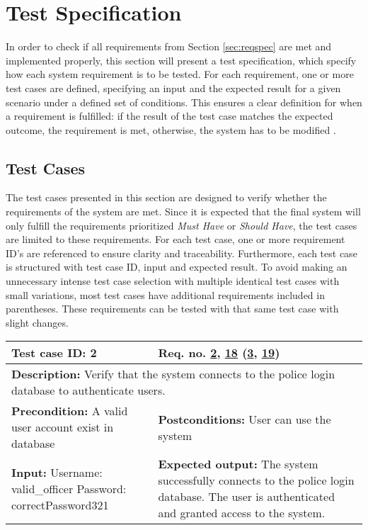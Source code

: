 \section{Test Specification}
\label{sec:testspec}

In order to check if all requirements from Section \ref{sec:reqspec} are met and implemented properly, this section will present a test specification, which specify how each system requirement is to be tested. For each requirement, one or more test cases are defined, specifying an input and the expected result for a given scenario under a defined set of conditions. This ensures a clear definition for when a requirement is fulfilled: if the result of the test case matches the expected outcome, the requirement is met, otherwise, the system has to be modified \cite{testspec_geek}.

\subsection{Test Cases}
The test cases presented in this section are designed to verify whether the requirements of the system are met. Since it is expected that the final system will only fulfill the requirements prioritized \textit{Must Have} or \textit{Should Have}, the test cases are limited to these requirements. 
For each test case, one or more requirement ID's are referenced to ensure clarity and traceability. Furthermore, each test case is structured with test case ID, input and expected result. To avoid making an unnecessary intense test case selection with multiple identical test cases with small variations, most test cases have additional requirements included in parentheses. These requirements can be tested with that same test case with slight changes.
\begin{table}[H]
\begin{tabular}{|p{7cm}|p{7cm}|}
\hline
\rowcolor[HTML]{D8E9F7} 
\textbf{Test case ID: 2} & \textbf{Req. no. \hyperlink{req:2}{2}, \hyperlink{req:18}{18} (\hyperlink{req:3}{3}, \hyperlink{req:19}{19})}\\ \hline

\multicolumn{2}{|p{14cm}|}{\textbf{Description:} \newline Verify that the system connects to the police login database to authenticate users.} \\ \hline

\textbf{Precondition:} \newline A valid user account exist in database & 
\textbf{Postconditions:} \newline User can use the system \\ \hline

\textbf{Input:} \newline
Username: valid\_officer \newline
Password: correctPassword321&
\textbf{Expected output:} \newline
The system successfully connects to the police login database. \newline
The user is authenticated and granted access to the system. \\ \hline
\end{tabular}
\end{table}

